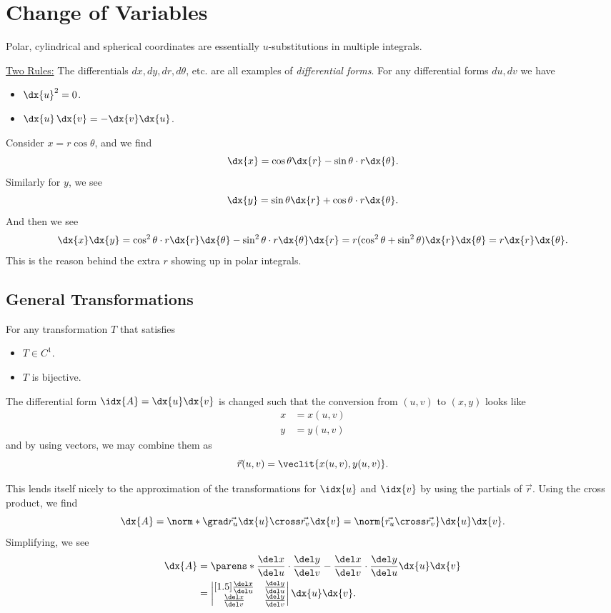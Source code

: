 \documentclass{article}
\begin{document}
\section{Change of Variables}
Polar, cylindrical and spherical coordinates are essentially $u$-substitutions in multiple integrals.

\underline{Two Rules:}
The differentials $dx, dy, dr, d\theta$, etc. are all examples of \emph{differential forms}.
For any differential forms $du, dv$ we have
\begin{itemize}
  \item $\dx{u}^{2} = 0$.
  \item $\dx{u}\, \dx{v} = - \dx{v}\dx{u}$.
\end{itemize}

\begin{ex}
  Consider $x = r\cos\theta$, and we find
  \[ \dx{x} = \cos\theta \dx{r} - \sin\theta \cdot  r\dx{\theta}. \]
  Similarly for $y$, we see
  \[ \dx{y} = \sin\theta \dx{r} + \cos\theta \cdot r\dx{\theta}. \]
  And then we see
  \[ \dx{x}\dx{y} = \cos^{2}\theta \cdot r\dx{r}\dx{\theta} - \sin^{2}\theta\cdot r\dx{\theta}\dx{r} = r(\cos^{2}\theta + \sin^{2}\theta)\dx{r}\dx{\theta} = r\dx{r}\dx{\theta}.  \]
  This is the reason behind the extra $r$ showing up in polar integrals.
\end{ex}

\subsection{General Transformations}
For any transformation $T$ that satisfies
\begin{itemize}
  \item $T \in C^{1}$.
  \item $T$ is bijective.
\end{itemize}
The differential form $\idx{A} = \dx{u}\dx{v}$ is changed such that the conversion from $(u, v)$ to $(x, y)$ looks like
\begin{align*}
  x &= x(u, v)\\
  y &= y(u, v)
\end{align*}
and by using vectors, we may combine them as
\[ \vec{r}(u, v) = \veclit{x(u, v), y(u, v)}. \]

This lends itself nicely to the approximation of the transformations for $\idx{u}$ and $\idx{v}$ by using the partials of $\vec{r}$.
Using the cross product, we find
\[ \dx{A} = \norm*{\grad \vec{r_{u}}\dx{u} \cross \vec{r_{v}}\dx{v}} = \norm{\vec{r_{u}} \cross \vec{r_{v}}}\dx{u}\dx{v}. \]
Simplifying, we see
\begin{align*}
  \dx{A} &= \parens*{\frac{\del x}{\del u} \cdot \frac{\del y}{\del v} - \frac{\del x}{\del v}\cdot\frac{\del y}{\del u}}\dx{u}\dx{v}\\
  &= \begin{vmatrix}[1.5]
    \frac{\del x}{\del u} & \frac{\del y}{\del u}\\
    \frac{\del x}{\del v} & \frac{\del y}{\del v}
  \end{vmatrix} \dx{u}\dx{v}.
\end{align*}
\end{document}
